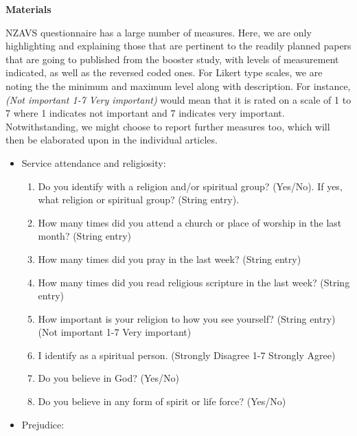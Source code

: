 \documentclass[
  man,
  longtable,
  nolmodern,
  notxfonts,
  notimes,
  colorlinks=true,linkcolor=blue,citecolor=blue,urlcolor=blue]{apa7}
\begin{document}
\textbf{Materials}

NZAVS questionnaire has a large number of measures. Here, we are only
highlighting and explaining those that are pertinent to the readily
planned papers that are going to published from the booster study, with
levels of measurement indicated, as well as the reversed coded ones. For
Likert type scales, we are noting the the minimum and maximum level
along with description. For instance, \emph{(Not important 1-7 Very
important)} would mean that it is rated on a scale of 1 to 7 where 1
indicates not important and 7 indicates very important. Notwithstanding,
we might choose to report further measures too, which will then be
elaborated upon in the individual articles.

\begin{itemize}
\item
  Service attendance and religiosity:

  \begin{enumerate}
  \def\labelenumi{\arabic{enumi}.}
  \item
    Do you identify with a religion and/or spiritual group? (Yes/No). If
    yes, what religion or spiritual group? (String entry).
  \item
    How many times did you attend a church or place of worship in the
    last month? (String entry)
  \item
    How many times did you pray in the last week? (String entry)
  \item
    How many times did you read religious scripture in the last week?
    (String entry)
  \item
    How important is your religion to how you see yourself? (String
    entry) (Not important 1-7 Very important)
  \item
    I identify as a spiritual person. (Strongly Disagree 1-7 Strongly
    Agree)
  \item
    Do you believe in God? (Yes/No)
  \item
    Do you believe in any form of spirit or life force? (Yes/No)
  \end{enumerate}
\item
  Prejudice:


\end{itemize}
\end{document}
